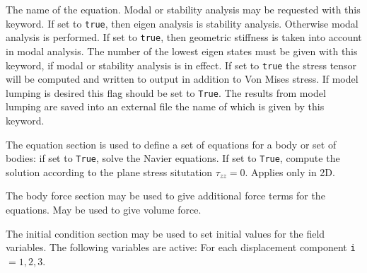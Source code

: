 \sifbegin
{} 
The name of the equation.
Modal or stability analysis may be requested with this keyword.
If set to {\tt{true}}, then eigen analysis is stability analysis.
Otherwise modal analysis is performed.
If set to {\tt{true}}, then geometric stiffness is taken into account in modal analysis.
The number of the lowest eigen states must be given with this keyword,
if modal or stability analysis is in effect.
If set to {\tt{true}} the stress tensor will be computed and written to
output in addition to Von Mises stress.
If model lumping is desired this flag should be set to \texttt{True}.
The results from model lumping are saved into an external file the 
name of which is given by this keyword.
\sifend

The equation section is used to define a set of equations for a body or set of bodies:
\sifbegin
{} if set to {\tt True}, solve the Navier equations.
 If set to {\tt True}, compute the solution
according to the plane stress situtation $\tau_{zz}=0$. Applies only in 2D.
\sifend

The body force section may be used to give additional force terms for the equations.
\sifbegin
{} May be used to give volume force.
\sifend

The initial condition section may be used to set initial values for the field
variables. The following variables are active:
\sifbegin
{} 
For each displacement component {\tt i}$=1,2,3$.
\sifend

